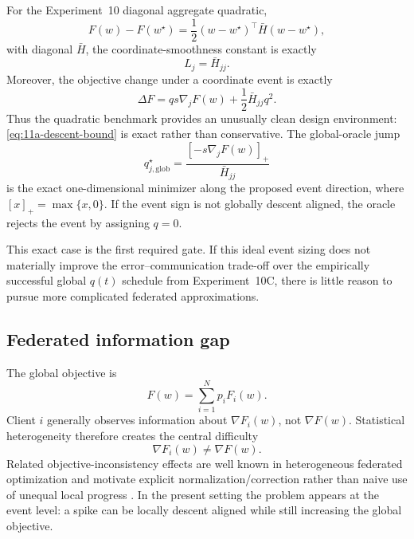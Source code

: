 For the Experiment~10 diagonal aggregate quadratic,
\begin{equation}
  F(w)-F(w^\star)
  =
  \frac12(w-w^\star)^\top \bar H(w-w^\star),
\end{equation}
with diagonal $\bar H$, the coordinate-smoothness constant is exactly
\begin{equation}
  L_j=\bar H_{jj}.
\end{equation}
Moreover, the objective change under a coordinate event is exactly
\begin{equation}
  \Delta F
  =q s\nabla_jF(w)+\frac12\bar H_{jj}q^2.
  \label{eq:11a-exact-quadratic-change}
\end{equation}
Thus the quadratic benchmark provides an unusually clean design environment: \cref{eq:11a-descent-bound} is exact rather than conservative. The global-oracle jump
\begin{equation}
  q_{j,\mathrm{glob}}^\star
  =
  \frac{[-s\nabla_jF(w)]_+}{\bar H_{jj}}
\end{equation}
is the exact one-dimensional minimizer along the proposed event direction, where $[x]_+=\max\{x,0\}$. If the event sign is not globally descent aligned, the oracle rejects the event by assigning $q=0$.

This exact case is the first required gate. If this ideal event sizing does not materially improve the error--communication trade-off over the empirically successful global $q(t)$ schedule from Experiment~10C, there is little reason to pursue more complicated federated approximations.

\subsection{Federated information gap}

The global objective is
\begin{equation}
  F(w)=\sum_{i=1}^Np_iF_i(w).
\end{equation}
Client $i$ generally observes information about $\nabla F_i(w)$, not $\nabla F(w)$. Statistical heterogeneity therefore creates the central difficulty
\begin{equation}
  \nabla F_i(w)\neq \nabla F(w).
\end{equation}
Related objective-inconsistency effects are well known in heterogeneous federated optimization and motivate explicit normalization/correction rather than naive use of unequal local progress \cite{wang2020fednova}. In the present setting the problem appears at the event level: a spike can be locally descent aligned while still increasing the global objective.

